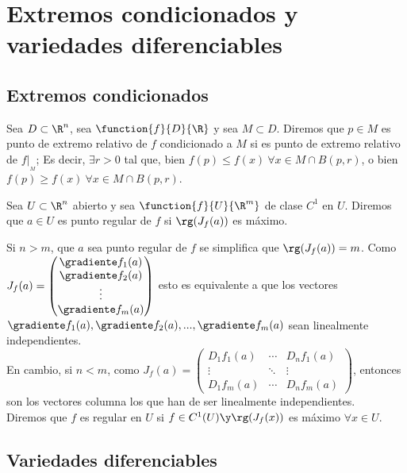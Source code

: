 \chapter[Extremos cond. y variedades diferenciables]{Extremos condicionados y variedades diferenciables}
\section{Extremos condicionados}

\begin{defi} Sea $D\subset\R^n$, sea $\function{f}{D}{\R}$ y sea $M\subset D$. Diremos que $p\in M$ es punto de extremo relativo de $f$ condicionado a $M$ si es punto de extremo relativo de $f|_{_M}$; Es decir, $\exists r>0$ tal que, bien $f(p)\leq f(x)\ \forall x\in M\cap B(p,r)$, o bien $f(p)\geq f(x)\ \forall x\in M\cap B(p,r)$.
\end{defi}

\begin{defi} Sea $U\subset\R^n$ abierto y sea $\function{f}{U}{\R^m}$ de clase $C^1$ en $U$. Diremos que $a\in U$ es punto regular de $f$ si $\rg(J_f(a))$ es máximo.
\end{defi}

\begin{observacion} Si $n>m$, que $a$ sea punto regular de $f$ se simplifica que $\rg(J_f(a))=m$. Como $J_f(a)=\begin{pmatrix}\gradiente f_1(a)\\\gradiente f_2(a)\\\vdots\\\gradiente f_m(a)
\end{pmatrix}$ esto es equivalente a que los vectores $\gradiente f_1(a),\gradiente f_2(a),...,\gradiente f_m(a)$ sean linealmente independientes.\\
En cambio, si $n<m$, como $J_f(a)=\begin{pmatrix}D_1f_1(a)&\cdots&D_nf_1(a)\\\vdots&\ddots&\vdots\\ D_1f_m(a)&\cdots &D_nf_m(a)\end{pmatrix}$, entonces son los vectores columna los que han de ser linealmente independientes.\\
Diremos que $f$ es regular en $U$ si $f\in C^1(U)\y\rg(J_f(x))$ es máximo $\forall x\in U$.
\end{observacion}

\section{Variedades diferenciables}

